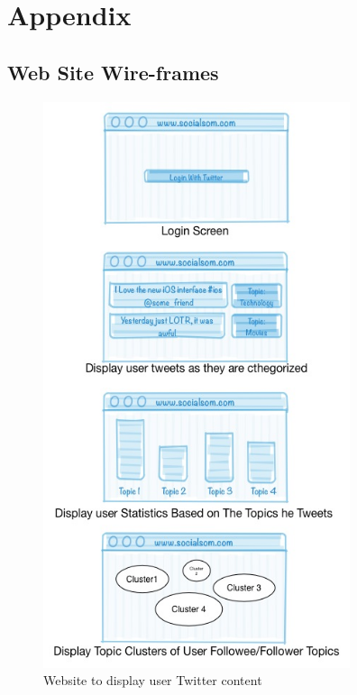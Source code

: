 \newpage
\appendix
\section{Appendix} %
\label{sec:attachments}

\subsection{Web Site Wire-frames} %
\label{sec:web_site_wire_frames}
\begin{figure}[tb]
  \begin{center}
    \includegraphics[width=9cm]{images/9_wireframes}
  \end{center}
  \caption{Website to display user Twitter content}
  \label{fig:wireframes}
\end{figure}

